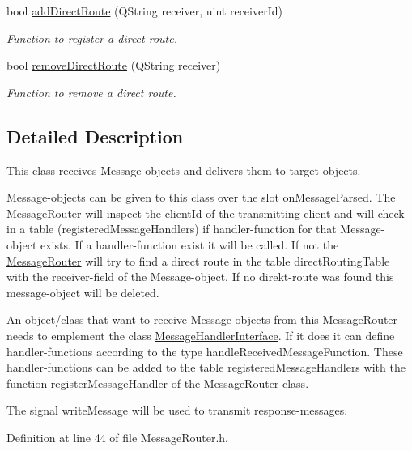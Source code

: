 \begin{DoxyCompactItemize}
bool \hyperlink{class_server_appl_1_1_message_router_a844d25bee8a5dfcaa16cc8c9e807a5b1}{add\+Direct\+Route} (Q\+String receiver, uint receiver\+Id)
\begin{DoxyCompactList}\small\item\em Function to register a direct route. \end{DoxyCompactList}\item 
bool \hyperlink{class_server_appl_1_1_message_router_a3b2a59837ef4592b010d4af0269cadfe}{remove\+Direct\+Route} (Q\+String receiver)
\begin{DoxyCompactList}\small\item\em Function to remove a direct route. \end{DoxyCompactList}\end{DoxyCompactItemize}


\subsection{Detailed Description}
This class receives Message-\/objects and delivers them to target-\/objects. 

Message-\/objects can be given to this class over the slot on\+Message\+Parsed. The \hyperlink{class_server_appl_1_1_message_router}{Message\+Router} will inspect the client\+Id of the transmitting client and will check in a table (registered\+Message\+Handlers) if handler-\/function for that Message-\/object exists. If a handler-\/function exist it will be called. If not the \hyperlink{class_server_appl_1_1_message_router}{Message\+Router} will try to find a direct route in the table direct\+Routing\+Table with the receiver-\/field of the Message-\/object. If no direkt-\/route was found this message-\/object will be deleted.

An object/class that want to receive Message-\/objects from this \hyperlink{class_server_appl_1_1_message_router}{Message\+Router} needs to emplement the class \hyperlink{class_server_appl_1_1_message_handler_interface}{Message\+Handler\+Interface}. If it does it can define handler-\/functions according to the type handle\+Received\+Message\+Function. These handler-\/functions can be added to the table registered\+Message\+Handlers with the function register\+Message\+Handler of the Message\+Router-\/class.

The signal write\+Message will be used to transmit response-\/messages. 

Definition at line 44 of file Message\+Router.\+h.



